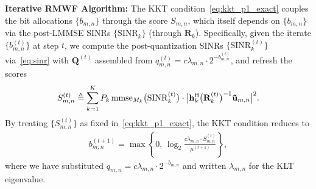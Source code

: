 \documentclass[10pt, twocolumn, comsoc]{IEEEtran}
\begin{document}
{\bf{Iterative RMWF Algorithm:}}
The KKT condition~\eqref{eq:kkt_p1_exact} couples 
the bit allocations $\{b_{m,n}\}$ through the score 
$S_{m,n}$, which itself depends on $\{b_{m,n}\}$ via 
the post-LMMSE SINRs $\{\mathrm{SINR}_k\}$ (through 
$\mathbf{R}_k$). 
Specifically, given the iterate $\{b_{m,n}^{(t)}\}$ at step $t$, we compute the post-quantization SINRs $\{\mathrm{SINR}_k^{(t)}\}$ via~\eqref{eq:sinr} with $\mathbf{Q}^{(t)}$ assembled from $q_{m,n}^{(t)} = c \lambda_{m,n} \cdot 2^{-b_{m,n}^{(t)}}$, and refresh the scores
\begin{align} \label{eq:score_update}
  S_{m,n}^{(t)} 
  \triangleq \sum_{k=1}^{K} 
    P_k \, \mathrm{mmse}_{M_k}\big(\mathrm{SINR}_k^{(t)}\big) 
    \cdot \big|\mathbf{h}_k^{\sf H} 
              \big(\mathbf{R}_k^{(t)}\big)^{-1} 
              \mathbf{\tilde u}_{m,n}\big|^2.
\end{align}
By treating $\{S_{m,n}^{(t)}\}$ as fixed in~\eqref{eq:kkt_p1_exact}, the KKT condition reduces to
\begin{align} \label{eq:bit_update_p1}
  b_{m,n}^{(t+1)} 
  = \max\left\{
  0,\,
  \log_2 \frac{c\lambda_{m,n} \cdot S_{m,n}^{(t)}}
                {\mu^{(t+1)}}\right\},
\end{align}
where we have substituted $q_{m,n} = c \lambda_{m,n} \cdot 2^{-b_{m,n}}$ and 
written $\lambda_{m,n}$ for the KLT eigenvalue. 

\end{document}
